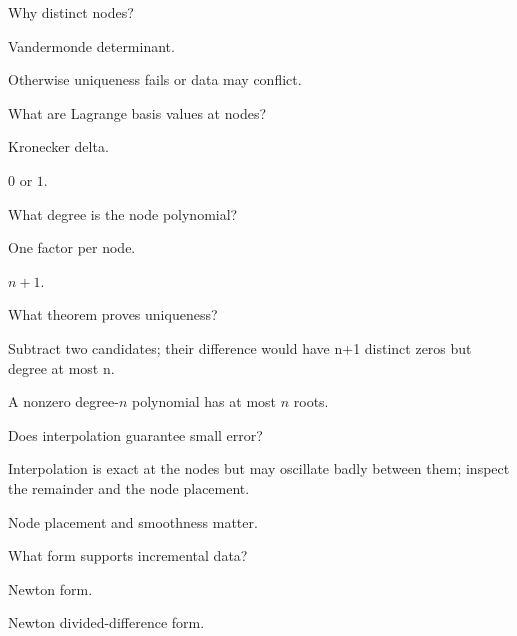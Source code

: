 \begin{exercise}\label{exr:ii20-03}
Why distinct nodes?
\end{exercise}
\begin{hint}
Vandermonde determinant.
\end{hint}
\begin{solution}
Otherwise uniqueness fails or data may conflict.
\end{solution}

\begin{exercise}\label{exr:ii20-04}
What are Lagrange basis values at nodes?
\end{exercise}
\begin{hint}
Kronecker delta.
\end{hint}
\begin{solution}
$0$ or $1$.
\end{solution}

\begin{exercise}\label{exr:ii20-05}
What degree is the node polynomial?
\end{exercise}
\begin{hint}
One factor per node.
\end{hint}
\begin{solution}
$n+1$.
\end{solution}

\begin{exercise}\label{exr:ii20-06}
What theorem proves uniqueness?
\end{exercise}
\begin{hint}
Subtract two candidates; their difference would have n+1 distinct zeros but degree at most n.
\end{hint}
\begin{solution}
A nonzero degree-$n$ polynomial has at most $n$ roots.
\end{solution}

\begin{exercise}\label{exr:ii20-07}
Does interpolation guarantee small error?
\end{exercise}
\begin{hint}
Interpolation is exact at the nodes but may oscillate badly between them; inspect the remainder and the node placement.
\end{hint}
\begin{solution}
Node placement and smoothness matter.
\end{solution}

\begin{exercise}\label{exr:ii20-08}
What form supports incremental data?
\end{exercise}
\begin{hint}
Newton form.
\end{hint}
\begin{solution}
Newton divided-difference form.
\end{solution}


